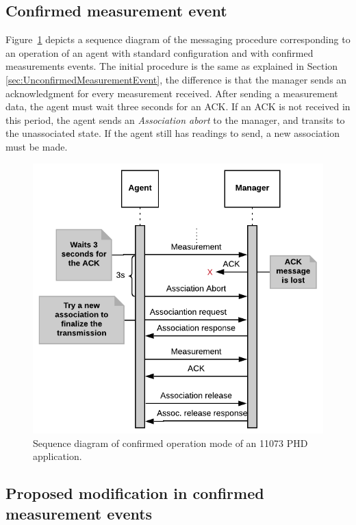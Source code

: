 \subsection{Confirmed measurement event}

Figure~\ref{fig:confirmedMode} depicts a sequence diagram of the messaging procedure corresponding to an operation of an agent with standard configuration and with confirmed measurements events. The initial procedure is the same as explained in Section \ref{sec:UnconfirmedMeasurementEvent}, the difference is that the manager sends an acknowledgment for every measurement received. After sending a measurement data, the agent must wait three seconds for an ACK. If an ACK is not received in this period, the agent sends an \textit{Association abort} to the manager, and transits to the unassociated state. If the agent still has readings to send, a new association must be made.

\begin{figure}[htbp]
\centerline{\includegraphics[width=\linewidth]{figures/confirmedModeWithAckLoss.png}}
\caption{Sequence diagram of confirmed operation mode of an 11073 PHD application.}
\label{fig:confirmedMode}
\end{figure}

\subsection{Proposed modification in confirmed measurement events}

